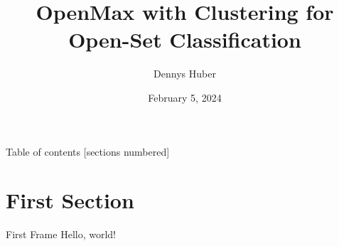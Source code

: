 \documentclass{beamer}
\title{OpenMax with Clustering for Open-Set Classification}
\date{February 5, 2024}
\author{Dennys Huber}
\institute{University of Zurich}
\begin{document}
  \maketitle

  \begin{frame}{Table of contents}
  [sections numbered]
  \tableofcontents%
\end{frame}

  \section{First Section}
  
  \begin{frame}{First Frame}
    Hello, world!
  \end{frame}
\end{document}

